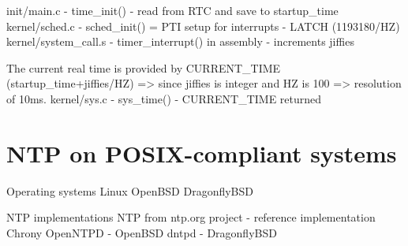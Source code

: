 init/main.c - time_init() - read from RTC and save to startup_time
kernel/sched.c - sched_init() = PTI setup for interrupts - LATCH (1193180/HZ)
kernel/system_call.s - timer_interrupt() in assembly - increments jiffies

The current real time is provided by CURRENT_TIME (startup_time+jiffies/HZ) => since jiffies is integer and HZ is 100 => resolution of 10ms.
kernel/sys.c - sys_time() - CURRENT_TIME returned


\section{NTP on POSIX-compliant systems}
Operating systems
Linux
OpenBSD
DragonflyBSD

NTP implementations
NTP from ntp.org project - reference implementation
Chrony
OpenNTPD - OpenBSD
dntpd - DragonflyBSD


